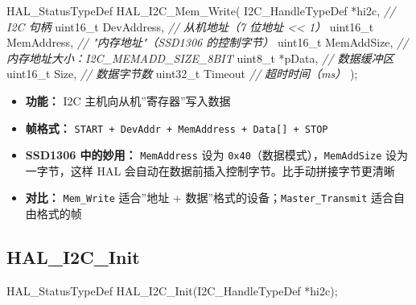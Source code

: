 \documentclass[
  chinese,
  UTF8,
  oneside,
  openany]{ctexbook}
\newenvironment{Shaded}{}{}
\newcommand{\CommentTok}[1]{\textcolor[rgb]{0.38,0.63,0.69}{\textit{#1}}}
\newcommand{\DataTypeTok}[1]{\textcolor[rgb]{0.56,0.13,0.00}{#1}}
\newcommand{\NormalTok}[1]{#1}
\newcommand{\OperatorTok}[1]{\textcolor[rgb]{0.40,0.40,0.40}{#1}}
\providecommand{\tightlist}{%
  \setlength{\itemsep}{0pt}\setlength{\parskip}{0pt}}
\begin{document}
\begin{Shaded}
\begin{Highlighting}[]
\NormalTok{HAL\_StatusTypeDef HAL\_I2C\_Mem\_Write}\OperatorTok{(}
\NormalTok{    I2C\_HandleTypeDef }\OperatorTok{*}\NormalTok{hi2c}\OperatorTok{,}    \CommentTok{// I2C 句柄}
    \DataTypeTok{uint16\_t}\NormalTok{           DevAddress}\OperatorTok{,} \CommentTok{// 从机地址（7 位地址 \textless{}\textless{} 1）}
    \DataTypeTok{uint16\_t}\NormalTok{           MemAddress}\OperatorTok{,} \CommentTok{// "内存地址"（SSD1306 的控制字节）}
    \DataTypeTok{uint16\_t}\NormalTok{           MemAddSize}\OperatorTok{,} \CommentTok{// 内存地址大小：I2C\_MEMADD\_SIZE\_8BIT}
    \DataTypeTok{uint8\_t}           \OperatorTok{*}\NormalTok{pData}\OperatorTok{,}     \CommentTok{// 数据缓冲区}
    \DataTypeTok{uint16\_t}\NormalTok{           Size}\OperatorTok{,}      \CommentTok{// 数据字节数}
    \DataTypeTok{uint32\_t}\NormalTok{           Timeout    }\CommentTok{// 超时时间（ms）}
\OperatorTok{);}
\end{Highlighting}
\end{Shaded}

\begin{itemize}
\tightlist
\item
  \textbf{功能：} I2C 主机向从机''寄存器''写入数据
\item
  \textbf{帧格式：}
  \texttt{START\ +\ DevAddr\ +\ MemAddress\ +\ Data{[}{]}\ +\ STOP}
\item
  \textbf{SSD1306 中的妙用：} \texttt{MemAddress} 设为
  \texttt{0x40}（数据模式），\texttt{MemAddSize} 设为一字节，这样 HAL
  会自动在数据前插入控制字节。比手动拼接字节更清晰
\item
  \textbf{对比：} \texttt{Mem\_Write} 适合''地址 +
  数据''格式的设备；\texttt{Master\_Transmit} 适合自由格式的帧
\end{itemize}

\subsection{HAL\_I2C\_Init}\label{hal_i2c_init}

\begin{Shaded}
\begin{Highlighting}[]
\NormalTok{HAL\_StatusTypeDef HAL\_I2C\_Init}\OperatorTok{(}\NormalTok{I2C\_HandleTypeDef }\OperatorTok{*}\NormalTok{hi2c}\OperatorTok{);}
\end{Highlighting}
\end{Shaded}
\end{document}
